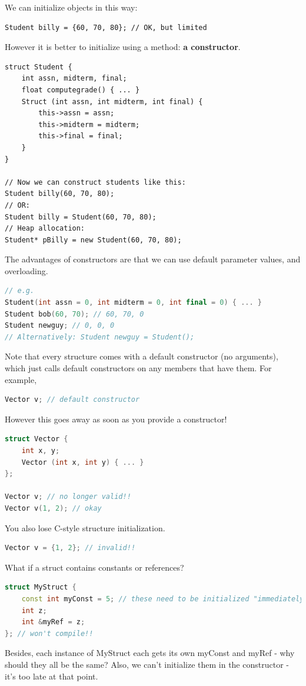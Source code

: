 \documentclass[english, 11pt]{article}
\begin{document}
We can initialize objects in this way:
\begin{lstlisting}
Student billy = {60, 70, 80}; // OK, but limited
\end{lstlisting}
However it is better to initialize using a method: \textbf{a constructor}.
\begin{lstlisting}
struct Student {
    int assn, midterm, final;
    float computegrade() { ... }
    Struct (int assn, int midterm, int final) {
        this->assn = assn;
        this->midterm = midterm;
        this->final = final;
    }
}

// Now we can construct students like this:
Student billy(60, 70, 80);
// OR:
Student billy = Student(60, 70, 80);
// Heap allocation:
Student* pBilly = new Student(60, 70, 80);
\end{lstlisting}
The advantages of constructors are that we can use default parameter values, and overloading.
\begin{lstlisting}[language=c++]
// e.g.
Student(int assn = 0, int midterm = 0, int final = 0) { ... }
Student bob(60, 70); // 60, 70, 0
Student newguy; // 0, 0, 0
// Alternatively: Student newguy = Student();
\end{lstlisting}
Note that every structure comes with a default constructor (no arguments), which just calls default constructors on any members that have them. For example,
\begin{lstlisting}[language=c++]
Vector v; // default constructor
\end{lstlisting}
However this goes away as soon as you provide a constructor!
\begin{lstlisting}[language=c++]
struct Vector {
    int x, y;
    Vector (int x, int y) { ... }
};

Vector v; // no longer valid!!
Vector v(1, 2); // okay
\end{lstlisting}
You also lose C-style structure initialization.
\begin{lstlisting}[language=c++]
Vector v = {1, 2}; // invalid!!
\end{lstlisting}
What if a struct contains constants or references?
\begin{lstlisting}[language=c++]
struct MyStruct {
    const int myConst = 5; // these need to be initialized "immediately"
    int z;
    int &myRef = z;
}; // won't compile!!
\end{lstlisting}
Besides, each instance of MyStruct each gets its own myConst and myRef - why should they all be the same? Also, we can't initialize them in the constructor - it's too late at that point. \\
\end{document}
